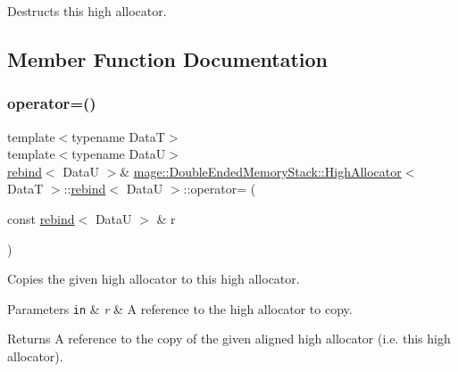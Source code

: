 Destructs this high allocator. 

\subsection{Member Function Documentation}
\hypertarget{structmage_1_1_double_ended_memory_stack_1_1_high_allocator_1_1rebind_a3b2599c125b2a1899d300c7f5c041141}{}\label{structmage_1_1_double_ended_memory_stack_1_1_high_allocator_1_1rebind_a3b2599c125b2a1899d300c7f5c041141} 
\subsubsection{\texorpdfstring{operator=()}{operator=()}\hspace{0.1cm}{\footnotesize\ttfamily [1/2]}}
{\footnotesize\ttfamily template$<$typename DataT$>$ \\
template$<$typename DataU$>$ \\
\hyperlink{structmage_1_1_double_ended_memory_stack_1_1_high_allocator_1_1rebind}{rebind}$<$ DataU $>$\& \hyperlink{structmage_1_1_double_ended_memory_stack_1_1_high_allocator}{mage\+::\+Double\+Ended\+Memory\+Stack\+::\+High\+Allocator}$<$ DataT $>$\+::\hyperlink{structmage_1_1_double_ended_memory_stack_1_1_high_allocator_1_1rebind}{rebind}$<$ DataU $>$\+::operator= (\begin{DoxyParamCaption}\item[{const \hyperlink{structmage_1_1_double_ended_memory_stack_1_1_high_allocator_1_1rebind}{rebind}$<$ DataU $>$ \&}]{r }\end{DoxyParamCaption})\hspace{0.3cm}{\ttfamily [delete]}}

Copies the given high allocator to this high allocator.


\begin{DoxyParams}[1]{Parameters}
\mbox{\tt in}  & {\em r} & A reference to the high allocator to copy. \\
\hline
\end{DoxyParams}
\begin{DoxyReturn}{Returns}
A reference to the copy of the given aligned high allocator (i.\+e. this high allocator). 
\end{DoxyReturn}
\hypertarget{structmage_1_1_double_ended_memory_stack_1_1_high_allocator_1_1rebind_a5170f26b07ec13b8f2dd5d7a5e6f6d46}{}\label{structmage_1_1_double_ended_memory_stack_1_1_high_allocator_1_1rebind_a5170f26b07ec13b8f2dd5d7a5e6f6d46} 

